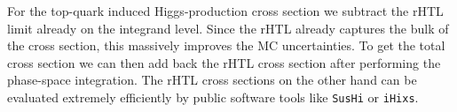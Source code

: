 For the top-quark induced Higgs-production cross section we subtract the \acs{rHTL} limit already on the integrand level. Since the \acs{rHTL} already captures the bulk of the cross section, this massively improves the \acs{MC} uncertainties. To get the total cross section we can then add back the \acs{rHTL} cross section after performing the phase-space integration. The \acs{rHTL} cross sections on the other hand can be evaluated extremely efficiently by public software tools like \texttt{SusHi} or \texttt{iHixs}.

